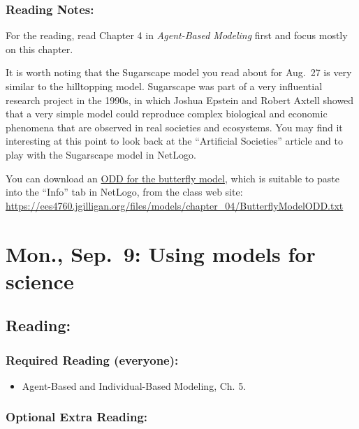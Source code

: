 \documentclass[
]{article}
\providecommand{\tightlist}{%
  \setlength{\itemsep}{0pt}\setlength{\parskip}{0pt}}
\begin{document}
\subsubsection{Reading Notes:}\label{reading-notes-3}

For the reading, read Chapter 4 in \emph{Agent-Based Modeling} first and
focus mostly on this chapter.

It is worth noting that the Sugarscape model you read about for Aug.~27
is very similar to the hilltopping model. Sugarscape was part of a very
influential research project in the 1990s, in which Joshua Epstein and
Robert Axtell showed that a very simple model could reproduce complex
biological and economic phenomena that are observed in real societies
and ecosystems. You may find it interesting at this point to look back
at the ``Artificial Societies'' article and to play with the Sugarscape
model in NetLogo.

You can download an
\href{/files/models/chapter_04/ButterflyModelODD.txt}{ODD for the
butterfly model}, which is suitable to paste into the ``Info'' tab in
NetLogo, from the class web site:
\url{https://ees4760.jgilligan.org/files/models/chapter_04/ButterflyModelODD.txt}

\section{Mon., Sep.~9: Using models for
science}\label{mon.-sep.-9-using-models-for-science}

\subsection{Reading:}\label{reading-5}

\subsubsection{Required Reading
(everyone):}\label{required-reading-everyone-4}

\begin{itemize}
\tightlist
\item
  Agent-Based and Individual-Based Modeling, Ch. 5.
\end{itemize}

\subsubsection{Optional Extra Reading:}\label{optional-extra-reading-2}
\end{document}
